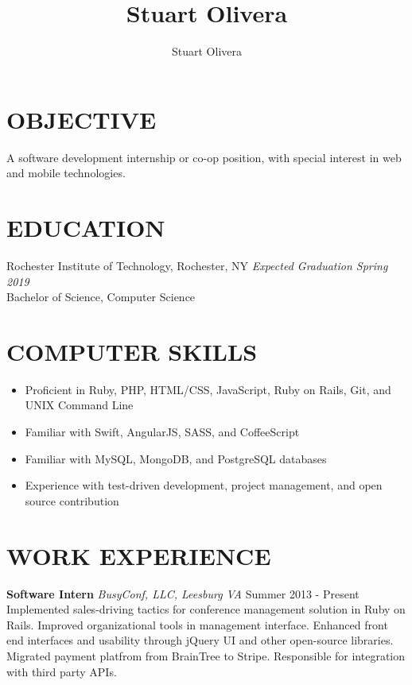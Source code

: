\documentclass[line]{res}
\author{Stuart Olivera}
\title{Stuart Olivera}
\begin{document}
\setlength{\textheight}{11.5in} %
\address{\large
  42960 Deer Chase Pl
  \\
  Ashburn, VA 20147
  \\
  (703) 509-9523
}
\address{\it
  stuart@stuartolivera.com
  \\
  http://stuartolivera.com/
  \\
  http://linkedin.com/in/stuartolivera
}

\begin{resume}

\section{OBJECTIVE}

  A software development internship or co-op position, with special interest in web and mobile technologies.

\section{EDUCATION}

  Rochester Institute of Technology, Rochester, NY
  \hfill
  \textit{Expected Graduation Spring 2019}
  \\
  Bachelor of Science, Computer Science

\section{COMPUTER SKILLS}

  \begin{itemize}[leftmargin=10pt]
  \item Proficient in Ruby, PHP, HTML/CSS, JavaScript, Ruby on Rails, Git, and UNIX Command Line
  \item Familiar with Swift, AngularJS, SASS, and CoffeeScript
  \item Familiar with MySQL, MongoDB, and PostgreSQL databases
  \item Experience with test-driven development, project management, and open source contribution
  \end{itemize}

\section{WORK EXPERIENCE}

  \textbf{Software Intern}
  \textit{BusyConf, LLC, Leesburg VA}
  \hfill
  Summer 2013 - Present\\
  Implemented sales-driving tactics for conference management solution in Ruby on Rails.
  Improved organizational tools in management interface.
  Enhanced front end interfaces and usability through jQuery UI and other open-source libraries.
  Migrated payment platfrom from BrainTree to Stripe.
  Responsible for integration with third party APIs.


\end{resume}
\end{document}
